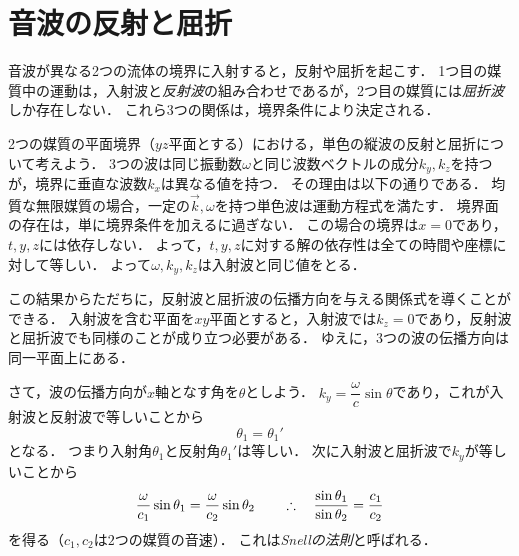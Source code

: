 \section{音波の反射と屈折}

音波が異なる2つの流体の境界に入射すると，反射や屈折を起こす．
1つ目の媒質中の運動は，入射波と\emph{反射波}の組み合わせであるが，2つ目の媒質には\emph{屈折波}しか存在しない．
これら3つの関係は，境界条件により決定される．


2つの媒質の平面境界（$yz$平面とする）における，単色の縦波の反射と屈折について考えよう．
3つの波は同じ振動数$\omega$と同じ波数ベクトルの成分$k_y,k_z$を持つが，境界に垂直な波数$k_x$は異なる値を持つ．
その理由は以下の通りである．
均質な無限媒質の場合，一定の$\vec{k},\omega$を持つ単色波は運動方程式を満たす．
境界面の存在は，単に境界条件を加えるに過ぎない．
この場合の境界は$x=0$であり，$t,y,z$には依存しない．
よって，$t,y,z$に対する解の依存性は全ての時間や座標に対して等しい．
よって$\omega,k_y,k_z$は入射波と同じ値をとる．


この結果からただちに，反射波と屈折波の伝播方向を与える関係式を導くことができる．
入射波を含む平面を$xy$平面とすると，入射波では$k_z=0$であり，反射波と屈折波でも同様のことが成り立つ必要がある．
ゆえに，3つの波の伝播方向は同一平面上にある．


さて，波の伝播方向が$x$軸となす角を$\theta$としよう．
$k_y = \dfrac{\omega}{c}\sin\theta$であり，これが入射波と反射波で等しいことから
\begin{equation}
    \theta_1 = \theta_1'
\end{equation}
となる．
つまり入射角$\theta_1$と反射角$\theta_1'$は等しい．
次に入射波と屈折波で$k_y$が等しいことから
\begin{equation}\label{eq66.2:スネルの法則}
    \frac{\omega}{c_1}\sin\theta_1 = \frac{\omega}{c_2}\sin\theta_2
    \qquad\therefore\quad \frac{\sin\theta_1}{\sin\theta_2} = \frac{c_1}{c_2}
\end{equation}
を得る（$c_1,c_2は2つの媒質の音速$）．
これは\emph{Snellの法則}と呼ばれる．



